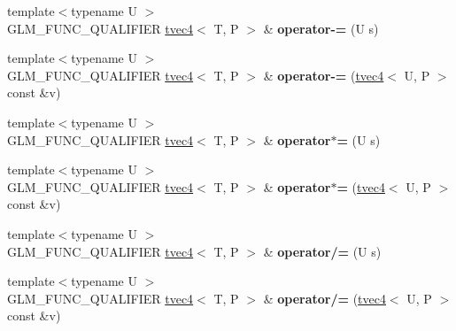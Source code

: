 \begin{DoxyCompactItemize}
\item 
\hypertarget{structglm_1_1detail_1_1tvec4_a9f142d5c9e7da212eb8cad6fbd77e5d3}{{\footnotesize template$<$typename U $>$ }\\G\-L\-M\-\_\-\-F\-U\-N\-C\-\_\-\-Q\-U\-A\-L\-I\-F\-I\-E\-R \hyperlink{structglm_1_1detail_1_1tvec4}{tvec4}$<$ T, P $>$ \& {\bfseries operator-\/=} (U s)}\label{structglm_1_1detail_1_1tvec4_a9f142d5c9e7da212eb8cad6fbd77e5d3}

\item 
\hypertarget{structglm_1_1detail_1_1tvec4_a73b420ad2330e7ea2cd2e9b4d1df7ba9}{{\footnotesize template$<$typename U $>$ }\\G\-L\-M\-\_\-\-F\-U\-N\-C\-\_\-\-Q\-U\-A\-L\-I\-F\-I\-E\-R \hyperlink{structglm_1_1detail_1_1tvec4}{tvec4}$<$ T, P $>$ \& {\bfseries operator-\/=} (\hyperlink{structglm_1_1detail_1_1tvec4}{tvec4}$<$ U, P $>$ const \&v)}\label{structglm_1_1detail_1_1tvec4_a73b420ad2330e7ea2cd2e9b4d1df7ba9}

\item 
\hypertarget{structglm_1_1detail_1_1tvec4_a15fd0b97ca8066f1d1caaf4aa845e917}{{\footnotesize template$<$typename U $>$ }\\G\-L\-M\-\_\-\-F\-U\-N\-C\-\_\-\-Q\-U\-A\-L\-I\-F\-I\-E\-R \hyperlink{structglm_1_1detail_1_1tvec4}{tvec4}$<$ T, P $>$ \& {\bfseries operator$\ast$=} (U s)}\label{structglm_1_1detail_1_1tvec4_a15fd0b97ca8066f1d1caaf4aa845e917}

\item 
\hypertarget{structglm_1_1detail_1_1tvec4_aec6e3cb70054a84d657c79435b212289}{{\footnotesize template$<$typename U $>$ }\\G\-L\-M\-\_\-\-F\-U\-N\-C\-\_\-\-Q\-U\-A\-L\-I\-F\-I\-E\-R \hyperlink{structglm_1_1detail_1_1tvec4}{tvec4}$<$ T, P $>$ \& {\bfseries operator$\ast$=} (\hyperlink{structglm_1_1detail_1_1tvec4}{tvec4}$<$ U, P $>$ const \&v)}\label{structglm_1_1detail_1_1tvec4_aec6e3cb70054a84d657c79435b212289}

\item 
\hypertarget{structglm_1_1detail_1_1tvec4_ae55fc4ecd1c6a0dbf09d0026835f58cc}{{\footnotesize template$<$typename U $>$ }\\G\-L\-M\-\_\-\-F\-U\-N\-C\-\_\-\-Q\-U\-A\-L\-I\-F\-I\-E\-R \hyperlink{structglm_1_1detail_1_1tvec4}{tvec4}$<$ T, P $>$ \& {\bfseries operator/=} (U s)}\label{structglm_1_1detail_1_1tvec4_ae55fc4ecd1c6a0dbf09d0026835f58cc}

\item 
\hypertarget{structglm_1_1detail_1_1tvec4_a766fdfa0e31c0a0fd31242798ed14250}{{\footnotesize template$<$typename U $>$ }\\G\-L\-M\-\_\-\-F\-U\-N\-C\-\_\-\-Q\-U\-A\-L\-I\-F\-I\-E\-R \hyperlink{structglm_1_1detail_1_1tvec4}{tvec4}$<$ T, P $>$ \& {\bfseries operator/=} (\hyperlink{structglm_1_1detail_1_1tvec4}{tvec4}$<$ U, P $>$ const \&v)}\label{structglm_1_1detail_1_1tvec4_a766fdfa0e31c0a0fd31242798ed14250}


\end{DoxyCompactItemize}
